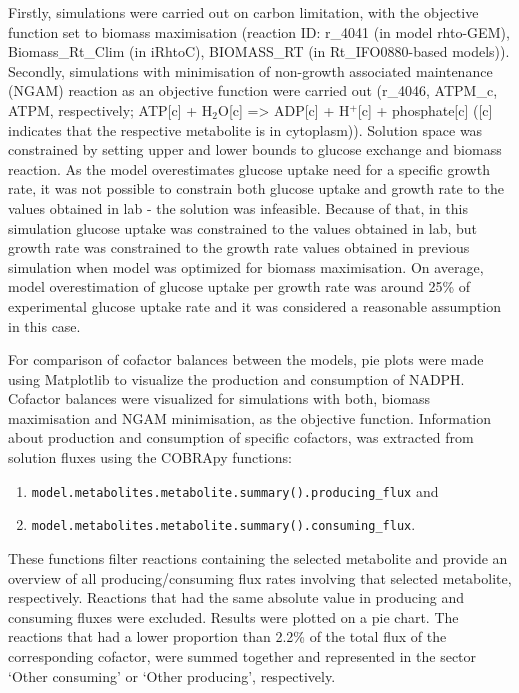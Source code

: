 Firstly, simulations were carried out on carbon limitation, with the objective function set to biomass maximisation (reaction ID: r\_4041 (in model rhto-GEM), Biomass\_Rt\_Clim (in iRhtoC), BIOMASS\_RT (in Rt\_IFO0880-based models)). Secondly, simulations with minimisation of non-growth associated maintenance (NGAM) reaction as an objective function were carried out (r\_4046, ATPM\_c, ATPM, respectively; ATP[c] + H$_2$O[c] => ADP[c] + H$^+$[c] + phosphate[c] ([c] indicates that the respective metabolite is in cytoplasm)). Solution space was constrained by setting upper and lower bounds to glucose exchange and biomass reaction. 
As the model overestimates glucose uptake need for a specific growth rate, it was not possible to constrain both glucose uptake and growth rate to the values obtained in lab - the solution was infeasible. Because of that, in this simulation glucose uptake was constrained to the values obtained in lab, but growth rate was constrained to the growth rate values obtained in previous simulation when model was optimized for biomass maximisation. On average, model overestimation of glucose uptake per growth rate was around 25\% of experimental glucose uptake rate and it was considered a reasonable assumption in this case.

For comparison of cofactor balances between the models, pie plots were made using Matplotlib to visualize the production and consumption of NADPH. %
Cofactor balances were visualized for simulations with both, biomass maximisation and NGAM minimisation, 
as the objective function. Information about production and consumption of specific cofactors, was extracted from solution fluxes using the COBRApy functions:
\vspace{-0.4cm} %
\begin{enumerate}[noitemsep, label=(\roman*)]
    \item \verb|model.metabolites.metabolite.summary().producing_flux| and
    \item \verb|model.metabolites.metabolite.summary().consuming_flux|. 
\end{enumerate}
\vspace{-0.4cm} %
These functions filter reactions containing the selected metabolite and provide an overview of all producing/consuming flux rates involving that selected metabolite, respectively.
Reactions that had the same absolute value in producing and consuming fluxes were excluded. Results were plotted on a pie chart. The reactions that had a lower proportion than 2.2\% of the total flux of the corresponding cofactor, were summed together and represented in the sector `Other consuming' or `Other producing', respectively.

